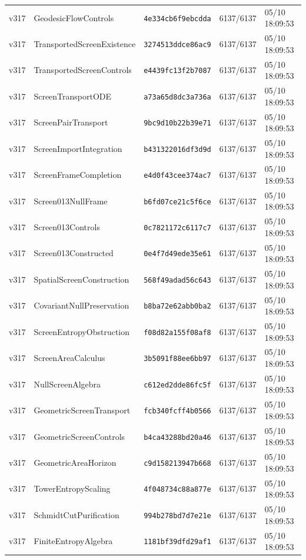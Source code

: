 \documentclass[11pt]{article}
\theoremstyle{definition}\newtheorem{deriv}{Derivação}
\begin{document}
{\begin{longtable}{@{}lllll@{}}
v317 & GeodesicFlowControls & \texttt{4e334cb6f9ebcdda} & 6137/6137 & 05/10 18:09:53 \\
v317 & TransportedScreenExistence & \texttt{3274513ddce86ac9} & 6137/6137 & 05/10 18:09:53 \\
v317 & TransportedScreenControls & \texttt{e4439fc13f2b7087} & 6137/6137 & 05/10 18:09:53 \\
v317 & ScreenTransportODE & \texttt{a73a65d8dc3a736a} & 6137/6137 & 05/10 18:09:53 \\
v317 & ScreenPairTransport & \texttt{9bc9d10b22b39e71} & 6137/6137 & 05/10 18:09:53 \\
v317 & ScreenImportIntegration & \texttt{b431322016df3d9d} & 6137/6137 & 05/10 18:09:53 \\
v317 & ScreenFrameCompletion & \texttt{e4d0f43cee374ac7} & 6137/6137 & 05/10 18:09:53 \\
v317 & Screen013NullFrame & \texttt{b6fd07ce21c5f6ce} & 6137/6137 & 05/10 18:09:53 \\
v317 & Screen013Controls & \texttt{0c7821172c6117c7} & 6137/6137 & 05/10 18:09:53 \\
v317 & Screen013Constructed & \texttt{0e4f7d49ede35e61} & 6137/6137 & 05/10 18:09:53 \\
v317 & SpatialScreenConstruction & \texttt{568f49adad56c643} & 6137/6137 & 05/10 18:09:53 \\
v317 & CovariantNullPreservation & \texttt{b8ba72e62abb0ba2} & 6137/6137 & 05/10 18:09:53 \\
v317 & ScreenEntropyObstruction & \texttt{f08d82a155f08af8} & 6137/6137 & 05/10 18:09:53 \\
v317 & ScreenAreaCalculus & \texttt{3b5091f88ee6bb97} & 6137/6137 & 05/10 18:09:53 \\
v317 & NullScreenAlgebra & \texttt{c612ed2dde86fc5f} & 6137/6137 & 05/10 18:09:53 \\
v317 & GeometricScreenTransport & \texttt{fcb340fcff4b0566} & 6137/6137 & 05/10 18:09:53 \\
v317 & GeometricScreenControls & \texttt{b4ca43288bd20a46} & 6137/6137 & 05/10 18:09:53 \\
v317 & GeometricAreaHorizon & \texttt{c9d158213947b668} & 6137/6137 & 05/10 18:09:53 \\
v317 & TowerEntropyScaling & \texttt{4f048734c88a877e} & 6137/6137 & 05/10 18:09:53 \\
v317 & SchmidtCutPurification & \texttt{994b278bd7d7e21e} & 6137/6137 & 05/10 18:09:53 \\
v317 & FiniteEntropyAlgebra & \texttt{1181bf39dfd29af1} & 6137/6137 & 05/10 18:09:53 \\

\end{longtable}}
\end{document}
